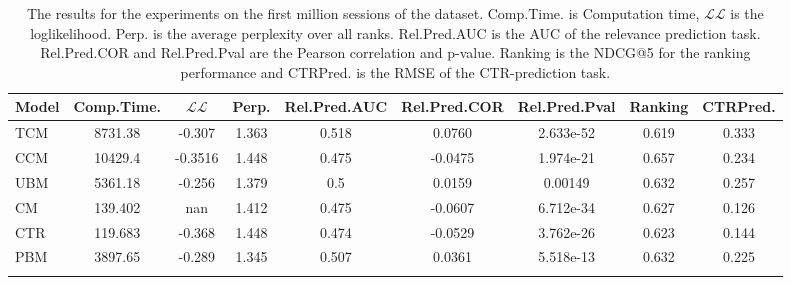 \begin{table}
	\centering
	\begin{tabular}{lcccccccc}
		\toprule
		Model	&	Comp.Time.	&	$\mathcal{LL}$	&	Perp.	&	Rel.Pred.AUC	&	Rel.Pred.COR	&	Rel.Pred.Pval	&	Ranking	&	CTRPred. \\ \midrule
		TCM	&	8731.38	&	-0.307	&	1.363	&	0.518	&	0.0760	&	2.633e-52	&	0.619	&	0.333 \\
		CCM	&	10429.4	&	-0.3516	&	1.448	&	0.475	&	-0.0475	&	1.974e-21	&	0.657	&	0.234 \\
		UBM	&	5361.18	&	-0.256	&	1.379	&	0.5		&	0.0159	&	0.00149		&	0.632	&	0.257 \\
		CM	&	139.402	&	nan		&	1.412	&	0.475	&	-0.0607	&	6.712e-34	&	0.627	&	0.126 \\
		CTR	&	119.683	&	-0.368	&	1.448	&	0.474	&	-0.0529	&	3.762e-26	&	0.623	&	0.144 \\
		PBM	&	3897.65	&	-0.289	&	1.345	&	0.507	&	0.0361	&	5.518e-13	&	0.632	&	0.225 \\ \bottomrule \\
	\end{tabular}
	\caption{The results for the experiments on the first million sessions of the dataset. Comp.Time. is Computation time, $\mathcal{LL}$ is the loglikelihood. Perp. is the average perplexity over all ranks. Rel.Pred.AUC is the AUC of the relevance prediction task. Rel.Pred.COR and Rel.Pred.Pval are the Pearson correlation and p-value. Ranking is the NDCG@5 for the ranking performance and CTRPred. is the RMSE of the CTR-prediction task.}
	\label{table:results}
\end{table}
